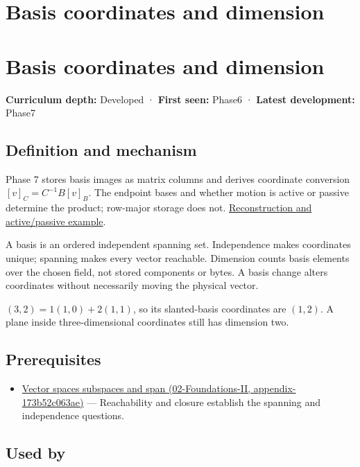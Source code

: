 \hypertarget{appendix-ce0341f7ea0d}{}
\section*{Basis coordinates and dimension}
\section{Basis coordinates and dimension}\label{basis-coordinates-and-dimension}

\textbf{Curriculum depth:} Developed · \textbf{First seen:} Phase6 · \textbf{Latest development:} Phase7

\subsection{Definition and mechanism}\label{definition-and-mechanism}

Phase 7 stores basis images as matrix columns and derives coordinate conversion \([v]_C=C^{-1}B[v]_B\). The endpoint bases and whether motion is active or passive determine the product; row-major storage does not. \href{Continuous\%20Notes/Computing\%20Foundations\%20-\%20From\%20Bits\%20to\%20C++\%20and\%20Systems\%20APIs\#Coordinates\%20can\%20change\%20while\%20the\%20geometric\%20object\%20stays\%20still}{Reconstruction and active/passive example}.

A basis is an ordered independent spanning set. Independence makes coordinates unique; spanning makes every vector reachable. Dimension counts basis elements over the chosen field, not stored components or bytes. A basis change alters coordinates without necessarily moving the physical vector.

\((3,2)=1(1,0)+2(1,1)\), so its slanted-basis coordinates are \((1,2)\). A plane inside three-dimensional coordinates still has dimension two.

\subsection{Prerequisites}\label{prerequisites}

\begin{itemize}
\tightlist
\item
  \href{}{Vector spaces subspaces and span (02-Foundations-II, appendix-173b52c063ae)} --- Reachability and closure establish the spanning and independence questions.
\end{itemize}

\subsection{Used by}\label{used-by}


